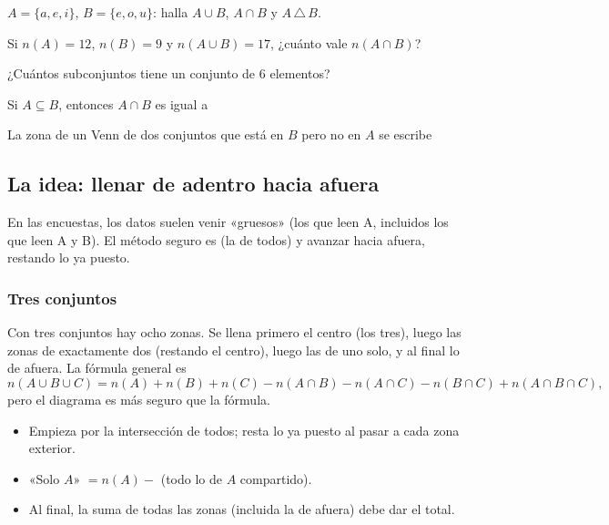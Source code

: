 \taller
{}
\begin{ejercicios}
\item $A = \{a, e, i\}$, $B = \{e, o, u\}$: halla $A \cup B$, $A \cap B$ y $A \,\triangle\, B$. 
\item Si $n(A) = 12$, $n(B) = 9$ y $n(A \cup B) = 17$, ¿cuánto vale $n(A \cap B)$? 
\item ¿Cuántos subconjuntos tiene un conjunto de 6 elementos? 
\end{ejercicios}
\begin{ejercicios}
\item Si $A \subseteq B$, entonces $A \cap B$ es igual a
\item La zona de un Venn de dos conjuntos que está en $B$ pero no en $A$ se escribe
\end{ejercicios}

\bitacora


\subsection{La idea: llenar de adentro hacia afuera}
En las encuestas, los datos suelen venir «gruesos» (los que leen A, incluidos los que leen A y B). El método seguro es
 (la de todos) y avanzar hacia afuera, restando lo ya puesto.


\subsubsection{Tres conjuntos}
Con tres conjuntos hay ocho zonas. Se llena primero el centro (los tres), luego las zonas de exactamente dos (restando
el centro), luego las de uno solo, y al final lo de afuera. La fórmula general es
\[n(A \cup B \cup C) = n(A) + n(B) + n(C) - n(A\cap B) - n(A \cap C) - n(B \cap C) + n(A \cap B \cap C),\]
pero el diagrama es más seguro que la fórmula.

\begin{regla}
\begin{itemize}
  \item Empieza por la intersección de todos; resta lo ya puesto al pasar a cada zona exterior.
  \item «Solo $A$» $= n(A) -$ (todo lo de $A$ compartido).
  \item Al final, la suma de todas las zonas (incluida la de afuera) debe dar el total.
\end{itemize}
\end{regla}

